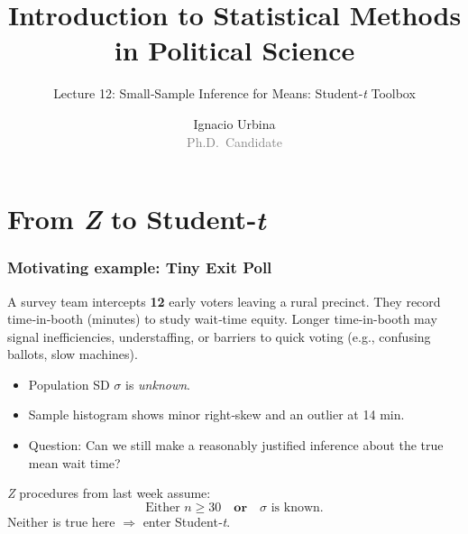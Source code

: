 \documentclass[handout]{beamer}
\title{Introduction to Statistical Methods in Political Science}
\subtitle{Lecture 12: Small‑Sample Inference for Means: Student‑\textit{t} Toolbox}
\author{Ignacio Urbina \texorpdfstring{\\ \vspace{0.3em}}{ } 
        \scriptsize \textcolor{gray}{Ph.D.\ Candidate}}
\date{}
\begin{document}
\frame{\titlepage}

\section{From \textit{Z} to Student‑\textit{t}}


\begin{frame}
\frametitle{Motivating example: Tiny Exit Poll}
\small
A survey team intercepts \textbf{12} early voters leaving a rural precinct.  They record time‑in‑booth (minutes) to study wait‑time equity. Longer time-in-booth may signal inefficiencies, understaffing, or barriers to quick voting (e.g., confusing ballots, slow machines).
\begin{itemize}
  \item Population SD \(\sigma\) is \emph{unknown}.  
  \item Sample histogram shows minor right‑skew and an outlier at 14 min.  
  \item Question: Can we still make a reasonably justified inference about the true mean wait time?
\end{itemize}
\pause
\textit{Z} procedures from last week assume:
\[
\text{Either } n\ge 30 \quad \textbf{or}\quad \sigma \text{ is known}.
\]
Neither is true here \(\Longrightarrow\) enter Student‑\textit{t}.
\end{frame}
\end{document}
